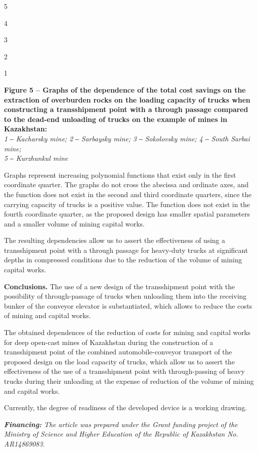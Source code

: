 5

4

3

2

1

{\bfseries Figure 5 -- Graphs of the dependence of the total cost savings
on the extraction of overburden rocks on the loading capacity of trucks
when constructing a transshipment point with a through passage compared
to the dead-end unloading of trucks on the example of mines in
Kazakhstan:\\
}\emph{1 ‒ Kacharsky mine; 2 ‒ Sarbaysky mine; 3 ‒ Sokolovsky mine; 4 ‒
South Sarbai mine;\\
5 ‒ Kurzhunkul mine}

Graphs represent increasing polynomial functions that exist only in the
first coordinate quarter. The graphs do not cross the abscissa and
ordinate axes, and the function does not exist in the second and third
coordinate quarters, since the carrying capacity of trucks is a positive
value. The function does not exist in the fourth coordinate quarter, as
the proposed design has smaller spatial parameters and a smaller volume
of mining capital works.

The resulting dependencies allow us to assert the effectiveness of using
a transshipment point with a through passage for heavy-duty trucks at
significant depths in compressed conditions due to the reduction of the
volume of mining capital works.

{\bfseries Conclusions.} The use of a new design of the transshipment point
with the possibility of through-passage of trucks when unloading them
into the receiving bunker of the conveyor elevator is substantiated,
which allows to reduce the costs of mining and capital works.

The obtained dependences of the reduction of costs for mining and
capital works for deep open-cast mines of Kazakhstan during the
construction of a transshipment point of the combined
automobile-conveyor transport of the proposed design on the load
capacity of trucks, which allow us to assert the effectiveness of the
use of a transshipment point with through-passing of heavy trucks during
their unloading at the expense of reduction of the volume of mining and
capital works.

Currently, the degree of readiness of the developed device is a working
drawing.

\emph{{\bfseries Financing:} The article was prepared under the Grant
funding project of the Ministry of Science and Higher Education of the
Republic of Kazakhstan No. AR14869083.}

